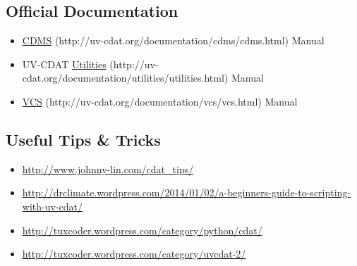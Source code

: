 \documentclass[letterpaper,10pt,english]{sphinxmanual}
\begin{document}
\subsection{Official Documentation}
\label{getting_started:official-documentation}\begin{itemize}
\item {} 
\href{http://uv-cdat.org/documentation/cdms/cdms.html}{CDMS} (http://uv-cdat.org/documentation/cdms/cdms.html) Manual

\item {} 
UV-CDAT \href{http://uv-cdat.org/documentation/utilities/utilities.html}{Utilities} (http://uv-cdat.org/documentation/utilities/utilities.html) Manual

\item {} 
\href{http://uv-cdat.org/documentation/vcs/vcs.html}{VCS} (http://uv-cdat.org/documentation/vcs/vcs.html) Manual

\end{itemize}


\subsection{Useful Tips \& Tricks}
\label{getting_started:useful-tips-tricks}\begin{itemize}
\item {} 
\href{http://www.johnny-lin.com/cdat\_tips/}{http://www.johnny-lin.com/cdat\_tips/}

\item {} 
\href{http://drclimate.wordpress.com/2014/01/02/a-beginners-guide-to-scripting-with-uv-cdat/}{http://drclimate.wordpress.com/2014/01/02/a-beginners-guide-to-scripting-with-uv-cdat/}

\item {} 
\href{http://tuxcoder.wordpress.com/category/python/cdat/}{http://tuxcoder.wordpress.com/category/python/cdat/}

\item {} 
\href{http://tuxcoder.wordpress.com/category/uvcdat-2/}{http://tuxcoder.wordpress.com/category/uvcdat-2/}

\end{itemize}
\end{document}
